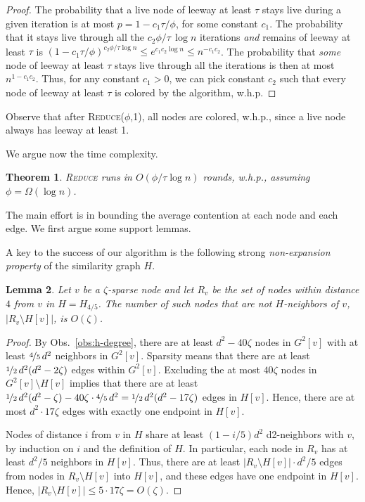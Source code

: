 \documentclass[12pt]{article}
\newtheorem{theorem}{Theorem}[section]
\newtheorem{lemma}[theorem]{Lemma}
\newcommand{\alg}[1]{\textsc{#1}}
\begin{document}
\begin{proof}
The probability that a live node of leeway at least $\tau$ stays live during a given iteration is at most $p = 1 - c_1 \tau/\phi$, for some constant $c_1$.
The probability that it stays live through all the $c_2 \phi/\tau\, \log n$ iterations \emph{and} remains of leeway at least $\tau$ is $(1 - c_1\tau/\phi)^{c_2\phi/\tau \log n} \le e^{c_1 c_2 \log n} \le n^{-c_1 c_2}$. The probability that \emph{some} node of leeway at least $\tau$ stays live through all the iterations is then at most $n^{1-c_1 c_2}$. 
Thus, for any constant $c_1 > 0$, we can pick constant $c_2$ such that every node of leeway at least $\tau$ is colored by the algorithm, w.h.p.
\end{proof}

Observe that after \alg{Reduce}($\phi$,1), all nodes are colored, w.h.p., since a live node always has leeway at least 1.

We argue now the time complexity.

\begin{theorem}
\alg{Reduce} runs in $O(\phi/\tau \log n)$ rounds, w.h.p., assuming $\phi = \Omega(\log n)$.
\label{thm:reduce-time}
\end{theorem}

The main effort is in bounding the average contention at each node and each edge.
We first argue some support lemmas.

A key to the success of our algorithm is the following strong \emph{non-expansion property} of the similarity graph $H$.

\begin{lemma}
Let $v$ be a $\zeta$-sparse node and let $R_v$ be the set of nodes within distance $4$ from $v$ in $H = H_{4/5}$. The number of such nodes that are not $H$-neighbors of $v$, $|R_v \setminus H[v]|$, is $O(\zeta)$.
\label{l:h4spread}
\end{lemma}
%
\begin{proof}
By Obs.~\ref{obs:h-degree}, 
there are at least $d^2 - 40\zeta$ nodes in $G^2[v]$ with at least $\nicefrac{4}{5}\, d^2$ neighbors in $G^2[v]$. 
Sparsity means that there are at least $\nicefrac{1}{2}\, d^2(d^2 - 2\zeta)$ edges within $G^2[v]$. 
Excluding the at most $40\zeta$ nodes in $G^2[v]\setminus H[v]$ implies that there are at least 
$\nicefrac{1}{2}\, d^2(d^2 - \zeta) - 40\zeta\cdot \nicefrac{4}{5}\,d^2  = \nicefrac{1}{2}\, d^2(d^2 - 17\zeta)$ edges in $H[v]$. Hence, there are at most $d^2 \cdot 17\zeta$ edges with exactly one endpoint in $H[v]$.

Nodes of distance $i$ from $v$ in $H$ share at least $(1-i/5)d^2$ d2-neighbors with $v$, by induction on $i$ and the definition of $H$. In particular, each node in $R_v$ has at least $d^2/5$ neighbors in $H[v]$. Thus, there are at least $|R_v \setminus H[v]| \cdot d^2/5$ edges from nodes in $R_v \setminus H[v]$ into $H[v]$, and these edges have one endpoint in $H[v]$. Hence, $|R_v \setminus H[v]| \le 5\cdot 17 \zeta = O(\zeta)$.
\end{proof}
\end{document}
